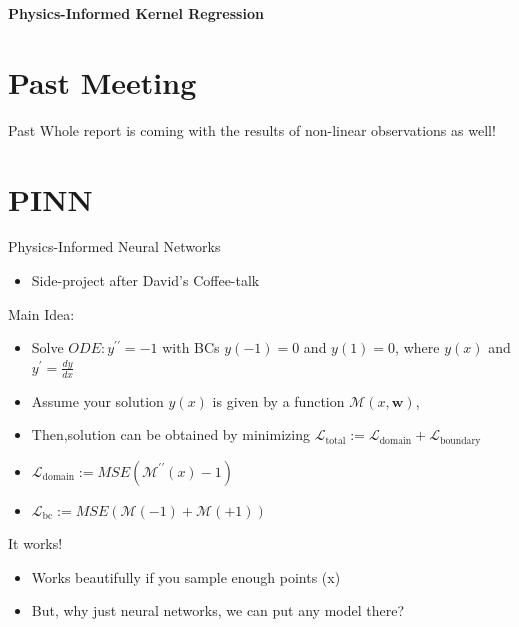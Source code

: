 \documentclass[aspectratio=169]{beamer}
\author{\authorlabel}
\newcommand{\mysubtitle}{\color{Pink}\Large{\textbf{Physics-Informed Kernel Regression}}}
\begin{document}



\begin{frame}
	\centering
	\mysubtitle
\end{frame}

\section{Past Meeting}
\begin{frame}{Past}
  \centering
  Whole report is coming with the results of non-linear observations as well!
\end{frame}

\section{PINN}
\begin{frame}{Physics-Informed Neural Networks}
  \centering
  \begin{itemize}
    \item Side-project after David's Coffee-talk
  \end{itemize}
  \color{Pink} Main Idea:\color{Black}
  \begin{itemize}
    \item Solve $ODE:y^{\prime\prime}=-1$ with BCs $y(-1)=0$ and $y(1)=0$, where $y(x)$ and $y^\prime=\frac{dy}{dx}$
    \item Assume your solution $y(x)$ is given by a function $\mathcal{M}(x,\mathbf{w})$,
    \item Then,solution can be obtained by minimizing $\mathcal{L}_{\text{total}}:=\mathcal{L}_{\text{domain}}+\mathcal{L}_{\text{boundary}}$
    \item $\mathcal{L}_{\text{domain}}:=MSE(\mathcal{M}^{\prime\prime}(x)-1)$
    \item $\mathcal{L}_{\text{bc}}:=MSE(\mathcal{M}(-1)+\mathcal{M}(+1))$
  \end{itemize}
\end{frame}

\begin{frame}{It works!}
  \begin{itemize}
    \item Works beautifully if you sample enough points (x)
    \item But, why just neural networks, we can put any model there?
  \end{itemize}
\end{frame}
\end{document}
